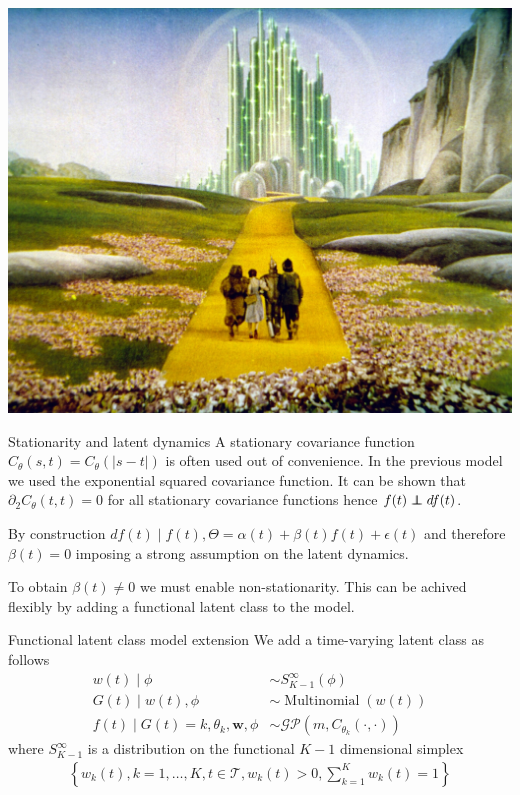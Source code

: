 \documentclass[ignorenonframetext,xcolor=pdflatex,table,dvipsnames,serif]{beamer}
\DeclareMathOperator{\Multinomial}{Multinomial}
\newcommand\independent{\protect\mathpalette{\protect\independenT}{\perp}}
\def\independenT#1#2{\mathrel{\rlap{$#1#2$}\mkern2mu{#1#2}}}
\begin{document}
\begin{frame}
\center\includegraphics[scale=0.1175]{ybr.jpeg}
\end{frame}

\begin{frame}{Stationarity and latent dynamics}
A stationary covariance function $C_\theta(s,t) = C_\theta(|s-t|)$ is often used out of convenience. In the previous model we used the exponential squared covariance function. It can be shown that $\partial_2 C_\theta(t,t) = 0$ for all stationary covariance functions hence $f(t) \independent df(t)$.

\pause

\vspace{0.8cm}

By construction $df(t) \mid f(t), \Theta = \alpha(t) + \beta(t)f(t) + \epsilon(t)$ and therefore $\beta(t) = 0$ imposing a strong assumption on the latent dynamics.

\vspace{0.8cm}

To obtain $\beta(t) \ne 0$ we must enable non-stationarity. This can be achived flexibly by adding a functional latent class to the model.
\end{frame}

\begin{frame}{Functional latent class model extension}
We add a time-varying latent class as follows
\begin{align*}
  w(t) \mid \phi &\sim S_{K-1}^\infty(\phi)\\
  G(t) \mid w(t), \phi &\sim \Multinomial(w(t))\\
  f(t) \mid G(t) = k, \theta_k, \mathbf{w}, \phi &\sim \mathcal{GP}(m, C_{\theta_k}(\cdot,\cdot))
\end{align*}
where $S_{K-1}^\infty$ is a distribution on the functional $K-1$ dimensional simplex
\begin{align*}
  \left\{w_k(t), k = 1,\ldots, K, t \in \mathcal{T}, w_k(t) > 0, \sum_{k=1}^K w_k(t) = 1\right\}
\end{align*}
\end{frame}
\end{document}
